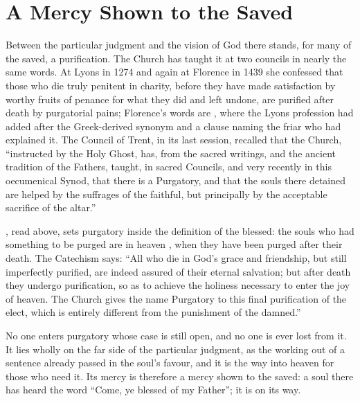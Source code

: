 \section{A Mercy Shown to the Saved}\label{sec:purgatory}

Between the particular judgment and the vision of God there stands, for many of the saved, a purification. The Church has taught it at two councils in nearly the same words. At Lyons in 1274 and again at Florence in 1439 she confessed that those who die truly penitent in charity, before they have made satisfaction by worthy fruits of penance for what they did and left undone, are purified after death by purgatorial pains; Florence's words are , where the Lyons profession had added after  the Greek-derived synonym  and a clause naming the friar who had explained it. The Council of Trent, in its last session, recalled that the Church, ``instructed by the Holy Ghost, has, from the sacred writings, and the ancient tradition of the Fathers, taught, in sacred Councils, and very recently in this oecumenical Synod, that there is a Purgatory, and that the souls there detained are helped by the suffrages of the faithful, but principally by the acceptable sacrifice of the altar.''

, read above, sets purgatory inside the definition of the blessed: the souls who had something to be purged are in heaven , when they have been purged after their death. The Catechism says: ``All who die in God's grace and friendship, but still imperfectly purified, are indeed assured of their eternal salvation; but after death they undergo purification, so as to achieve the holiness necessary to enter the joy of heaven. The Church gives the name Purgatory to this final purification of the elect, which is entirely different from the punishment of the damned.''

No one enters purgatory whose case is still open, and no one is ever lost from it. It lies wholly on the far side of the particular judgment, as the working out of a sentence already passed in the soul's favour, and it is the way into heaven for those who need it. Its mercy is therefore a mercy shown to the saved: a soul there has heard the word ``Come, ye blessed of my Father''; it is on its way.

